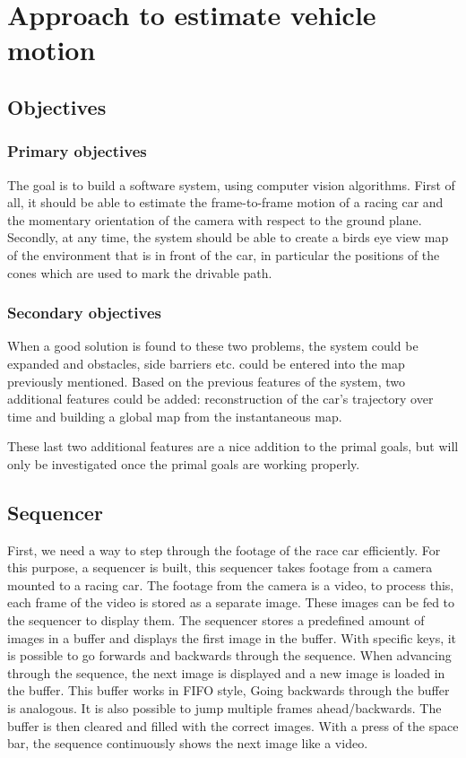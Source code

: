 \chapter{Approach to estimate vehicle motion}

\section{Objectives}
\subsection{Primary objectives}
The goal is to build a software system, using computer vision algorithms. First of all, it should be able to estimate the frame-to-frame motion of a racing car and the momentary orientation of the camera with respect to the ground plane. Secondly, at any time, the system should be able to create a birds eye view map of the environment that is in front of the car, in particular the positions of the cones which are used to mark the drivable path.\bigskip 

\subsection{Secondary objectives}
When a good solution is found to these two problems, the system could be expanded and obstacles, side barriers etc. could be entered into the map previously mentioned. Based on the previous features of the system, two additional features could be added: reconstruction of the car's trajectory over time and building a global map from the instantaneous map.\bigskip

These last two additional features are a nice addition to the primal goals, but will only be investigated once the primal goals are working properly.

\section{Sequencer}
First, we need a way to step through the footage of the race car efficiently. For this purpose, a sequencer is built, this sequencer takes footage from a camera mounted to a racing car. The footage from the camera is a video, to process this, each frame of the video is stored as a separate image. These images can be fed to the sequencer to display them. The sequencer stores a predefined amount of images in a buffer and displays the first image in the buffer. With specific keys, it is possible to go forwards and backwards through the sequence. When advancing through the sequence, the next image is displayed and a new image is loaded in the buffer. This buffer works in FIFO style, Going backwards through the buffer is analogous. It is also possible to jump multiple frames ahead/backwards. The buffer is then cleared and filled with the correct images. With a press of the space bar, the sequence continuously shows the next image like a video.

